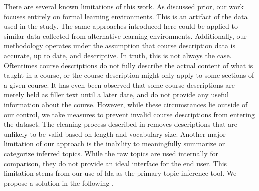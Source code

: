 
There are several known limitations of this work.
As discussed prior, our work focuses entirely on formal learning environments.
This is an artifact of the data used in the study.
The same approaches introduced here could be applied to similar data collected from alternative learning environments.
Additionally, our methodology operates under the assumption that course description data is accurate, up to date, and descriptive.
In truth, this is not always the case.
Oftentimes course descriptions do not fully describe the actual content of what is taught in a course, or the course description might only apply to some sections of a given course.
It has even been observed that some course descriptions are merely held as filler text until a later date, and do not provide any useful information about the course.
However, while these circumstances lie outside of our control, we take measures to prevent invalid course descriptions from entering the dataset.
The cleaning process described in  removes descriptions that are unlikely to be valid based on length and vocabulary size.
Another major limitation of our approach is the inability to meaningfully summarize or categorize inferred topics.
While the raw topics are used internally for comparison, they do not provide an ideal interface for the end user.
This limitation stems from our use of \ac{lda} as the primary topic inference tool.
We propose a solution in the following .

